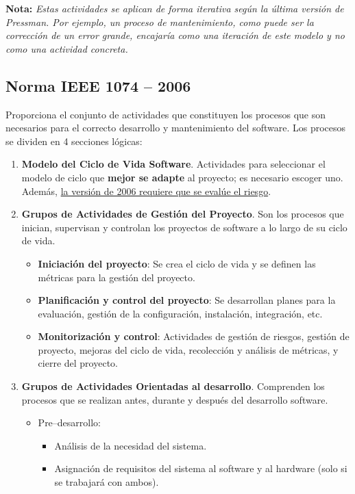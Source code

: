 \textbf{Nota:} \textit{Estas actividades se aplican de forma iterativa según la última versión de Pressman. Por ejemplo, un proceso de mantenimiento, como puede ser la corrección de un error grande, encajaría como una iteración de este modelo y no como una actividad concreta.}

\subsection{Norma IEEE 1074 -- 2006}
Proporciona el conjunto de actividades que constituyen los procesos que son necesarios para el correcto desarrollo y mantenimiento del software. Los procesos se dividen en 4 secciones lógicas:

\begin{enumerate}
    \item \textbf{Modelo del Ciclo de Vida Software}. Actividades para seleccionar el modelo de ciclo que \textbf{mejor se adapte} al proyecto; es necesario escoger uno. Además, \uline{la versión de 2006 requiere que se evalúe el riesgo}.
    \item \textbf{Grupos de Actividades de Gestión del Proyecto}. Son los procesos que inician, supervisan y controlan los proyectos de software a lo largo de su ciclo de vida.
          \begin{itemize}
              \item \textbf{Iniciación del proyecto}: Se crea el ciclo de vida y se definen las métricas para la gestión del proyecto.
              \item \textbf{Planificación y control del proyecto}: Se desarrollan planes para la evaluación, gestión de la configuración, instalación, integración, etc.
              \item \textbf{Monitorización y control}: Actividades de gestión de riesgos, gestión de proyecto, mejoras del ciclo de vida, recolección y análisis de métricas, y cierre del proyecto.
          \end{itemize}
    \item \textbf{Grupos de Actividades Orientadas al desarrollo}. Comprenden los procesos que se realizan antes, durante y después del desarrollo software.
          \begin{itemize}
              \item Pre--desarrollo:
                    \begin{itemize}
                        \item Análisis de la necesidad del sistema.
                        \item Asignación de requisitos del sistema al software y al hardware (solo si se trabajará con ambos).

\end{itemize}
\end{itemize}
\end{enumerate}
